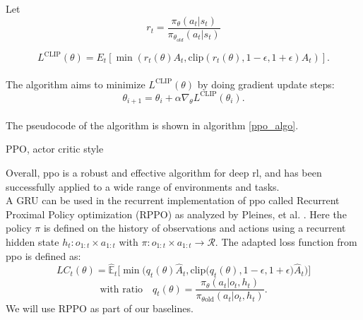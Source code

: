 Let
\begin{equation}
    r_t = \frac{\pi_{\theta}(a_t|s_t)}{\pi_{\theta_{old}}(a_t|s_t)}
\end{equation}

\begin{equation}
        L^{\mathrm{CLIP}}(\theta) = {E}_t \left[ \min \left(r_t(\theta) {A}_t, \text{clip} \left(r_t(\theta), 1-\epsilon, 1+\epsilon \right) {A}_t \right) \right].
\end{equation} \\

The algorithm aims to minimize $L^{\mathrm{CLIP}}(\theta)$ by doing gradient update steps:
\begin{equation}
    \theta_{i+1} = \theta_{i} + \alpha \nabla_{\theta} L^{\mathrm{CLIP}}(\theta_i).
\end{equation}\\

The pseudocode of the algorithm is shown in algorithm \ref{ppo_algo}.
\begin{algorithm}[h]
    \SetAlgoLined
    \caption{PPO, actor critic style}
    \label{ppo_algo}

\end{algorithm}
Overall, \ac{ppo} is a robust and effective algorithm for deep \ac{rl}, and has been successfully applied to a wide range of environments and tasks.\\

A GRU can be used in the recurrent implementation of \ac{ppo} called Recurrent Proximal Policy optimization (RPPO) as analyzed by Pleines, et al. 
\cite{RPPO}. Here the policy $\pi$ is defined on the history of observations and actions using a recurrent hidden state $h_t : o_{1:t} \times a_{1:t}$ with $\pi : o_{1:t} \times a_{1:t} \rightarrow \mathcal{R}$.
The adapted loss function from \ac{ppo} is defined as:
\begin{equation}
    LC_t(\theta) = \widehat{\mathbb{E}}_t\big[\min\big(q_t(\theta)\widehat{A}_t, \text{clip}\big(q_t(\theta), 1 - \epsilon, 1 + \epsilon\big)\widehat{A}_t\big)\big] \tag{1}
\end{equation}
\begin{equation*}
    \text{with ratio} \quad q_t(\theta) = \frac{\pi_{\theta}(a_t \vert o_t, h_t)}{\pi_{\theta \text{old}}(a_t \vert o_t, h_t)}.
\end{equation*}
We will use RPPO as part of our baselines.


